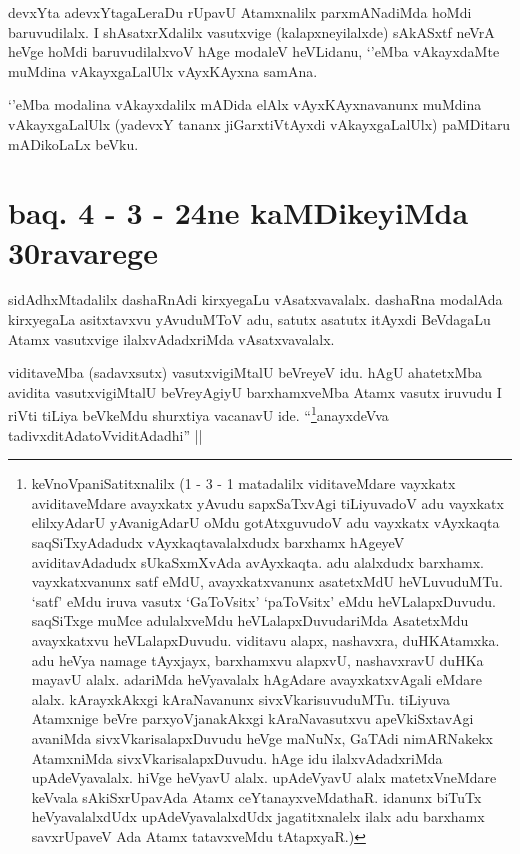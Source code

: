 
\begin{artha}
devxYta adevxYtagaLeraDu rUpavU Atamxnalilx parxmANadiMda hoMdi baruvudilalx. I shAsatxrXdalilx vasutxvige (kalapxneyilalxde) sAkASxtf neVrA heVge hoMdi baruvudilalxvoV hAge modaleV heVLidanu, `\stext'eMba vAkayxdaMte muMdina vAkayxgaLalUlx vAyxKAyxna samAna.
\end{artha}

\begin{artha}
`\stext'eMba modalina vAkayxdalilx mADida elAlx vAyxKAyxnavanunx muMdina vAkayxgaLalUlx (yadevxY tananx jiGarxtiVtAyxdi vAkayxgaLalUlx) paMDitaru mADikoLaLx beVku.  
\end{artha}

\section*{baq. 4 - 3 - 24ne kaMDikeyiMda 30ravarege}

\stext


\begin{artha}
sidAdhxMtadalilx dashaRnAdi kirxyegaLu vAsatxvavalalx. dashaRna modalAda kirxyegaLa asitxtavxvu yAvuduMToV adu, satutx asatutx itAyxdi BeVdagaLu Atamx vasutxvige ilalxvAdadxriMda vAsatxvavalalx.
\end{artha}


\begin{artha}
viditaveMba (sadavxsutx) vasutxvigiMtalU beVreyeV idu. hAgU ahatetxMba avidita vasutxvigiMtalU beVreyAgiyU barxhamxveMba Atamx vasutx iruvudu I riVti tiLiya beVkeMdu shurxtiya vacanavU ide. ``\footnote{keVnoVpaniSatitxnalilx (1 - 3 - 1 matadalilx viditaveMdare vayxkatx aviditaveMdare avayxkatx yAvudu sapxSaTxvAgi tiLiyuvadoV adu vayxkatx elilxyAdarU yAvanigAdarU oMdu gotAtxguvudoV adu vayxkatx vAyxkaqta saqSiTxyAdadudx vAyxkaqtavalalxdudx barxhamx hAgeyeV aviditavAdadudx sUkaSxmXvAda avAyxkaqta. adu alalxdudx barxhamx. vayxkatxvanunx satf eMdU, avayxkatxvanunx asatetxMdU heVLuvuduMTu. `satf' eMdu iruva vasutx `GaToV\s sitx' `paToV\s sitx' eMdu heVLalapxDuvudu. saqSiTxge muMce adulalxveMdu heVLalapxDuvudariMda AsatetxMdu avayxkatxvu heVLalapxDuvudu. viditavu alapx, nashavxra, duHKAtamxka. adu heVya namage tAyxjayx, barxhamxvu alapxvU, nashavxravU duHKa mayavU alalx. adariMda heVyavalalx hAgAdare avayxkatxvAgali eMdare alalx. kArayxkAkxgi kAraNavanunx sivxVkarisuvuduMTu. tiLiyuva Atamxnige beVre parxyoVjanakAkxgi kAraNavasutxvu apeVkiSxtavAgi avaniMda sivxVkarisalapxDuvudu heVge maNuNx, GaTAdi nimARNakekx AtamxniMda sivxVkarisalapxDuvudu. hAge idu ilalxvAdadxriMda upAdeVyavalalx. hiVge heVyavU alalx. upAdeVyavU alalx matetxVneMdare keVvala sAkiSxrUpavAda Atamx ceYtanayxveMdathaR. idanunx biTuTx heVyavalalxdUdx upAdeVyavalalxdUdx jagatitxnalelx ilalx adu barxhamx savxrUpaveV Ada Atamx tatavxveMdu tAtapxyaR.)}anayxdeVva tadivxditAdatoV\s viditAdadhi'' ||
\end{artha}

